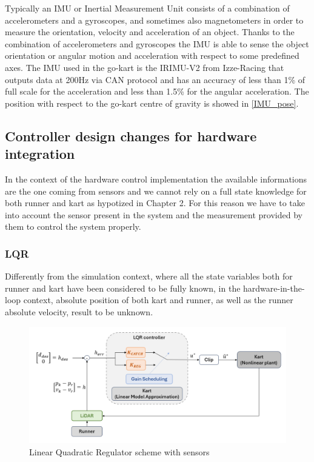 \documentclass[a4paper,12pt,oneside]{book}
\begin{document}
Typically an IMU or Inertial Measurement Unit consists of a combination of accelerometers and a gyroscopes, and sometimes also magnetometers in order to measure the orientation, velocity and acceleration of an object.
Thanks to the combination of accelerometers and gyroscopes the IMU is able to sense the object orientation or angular motion and acceleration with respect to some predefined axes.
The IMU used in the go-kart is the IRIMU-V2 from Izze-Racing that outputs data at 200Hz via CAN protocol and has an accuracy of less than 1\% of full scale for the acceleration and less than 1.5\% for the angular acceleration.
The position with respect to the go-kart centre of gravity is showed in \ref{IMU_pose}.


\subsection{Controller design changes for hardware integration}
In the context of the hardware control implementation the available informations are the one coming from sensors and we cannot rely on a full state knowledge for both runner and kart as hypotized in Chapter 2.
For this reason we have to take into account the sensor present in the system and the measurement provided by them to control the system properly. 

\subsubsection{LQR}
Differently from the simulation context, where all the state variables both for runner and kart have been considered to be fully known, in the hardware-in-the-loop context, absolute position of both kart and runner, as well as the runner absolute velocity, result to be unknown.

\begin{figure}
	\centering
	\includegraphics[width=1.0\textwidth]{LQR_hard_scheme.png}
	\caption{Linear Quadratic Regulator scheme with sensors}
	\label{image:LQR_hard_scheme}
\end{figure}
\end{document}
